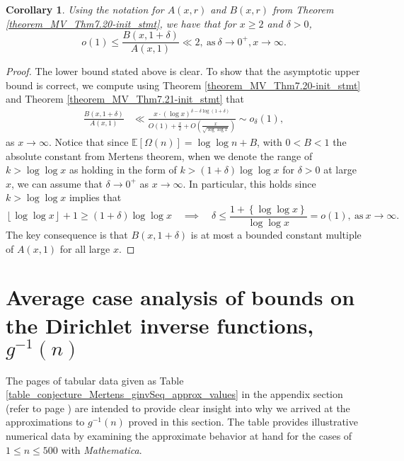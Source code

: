 \documentclass[11pt,reqno,a4letter]{article}
\numberwithin{figure}{section}
\numberwithin{table}{section}
\newcommand{\floor}[1]{\left\lfloor #1 \right\rfloor}
\theoremstyle{plain}
\newtheorem{cor}[theorem]{Corollary}
\numberwithin{theorem}{section}
\theoremstyle{definition}
\begin{document}
\begin{cor} 
\label{theorem_MV_Thm7.20} 
Using the notation for $A(x, r)$ and $B(x, r)$ from 
Theorem \ref{theorem_MV_Thm7.20-init_stmt}, 
we have that for $x \geq 2$ and $\delta > 0$, 
\[
o(1) \leq \frac{B(x, 1+\delta)}{A(x, 1)} \ll 2, 
     \mathrm{\ as\ } \delta \rightarrow 0^{+}, x \rightarrow \infty. 
\]
\end{cor} 
\begin{proof} 
The lower bound stated above is clear. To show that the asymptotic 
upper bound is correct, we compute using Theorem \ref{theorem_MV_Thm7.20-init_stmt} and 
Theorem \ref{theorem_MV_Thm7.21-init_stmt} that 
\begin{align*} 
\frac{B(x, 1+\delta)}{A(x, 1)} & \ll 
     \frac{x \cdot (\log x)^{\delta - \delta\log(1+\delta)}}{ 
     O(1) + \frac{x}{2} + 
     O\left(\frac{x}{\sqrt{\log\log x}}\right)} 
     \sim 
     o_{\delta}(1),  
\end{align*} 
as $x \rightarrow \infty$. Notice that since $\mathbb{E}[\Omega(n)] = \log\log n + B$, with $0 < B < 1$ the 
absolute constant from Mertens theorem, 
when we denote the range of $k > \log\log x$ as holding in the form of 
$k > (1 + \delta) \log\log x$ for $\delta > 0$ at large $x$, we can assume that 
$\delta \rightarrow 0^{+}$ as $x \rightarrow \infty$. 
In particular, this holds since $k > \log\log x$ implies that 
\[
\floor{\log\log x} + 1 \geq (1 + \delta) \log\log x \quad\implies\quad 
     \delta \leq \frac{1 + \left\{\log\log x\right\}}{\log\log x} = o(1), 
     \mathrm{\ as\ } x \rightarrow \infty. 
\] 
The key consequence is that $B(x, 1 + \delta)$ is at most a bounded constant multiple of 
$A(x, 1)$ for all large $x$. 
\end{proof} 

\newpage
\section{Average case analysis of bounds on the Dirichlet inverse functions, $g^{-1}(n)$} 
\label{Section_InvFunc_PreciseExpsAndAsymptotics} 

The pages of tabular data given as Table \ref{table_conjecture_Mertens_ginvSeq_approx_values} 
in the appendix section (refer to 
page \pageref{table_conjecture_Mertens_ginvSeq_approx_values}) are intended to 
provide clear insight into why we arrived at the approximations to 
$g^{-1}(n)$ proved in this section. The table provides illustrative 
numerical data by examining the approximate behavior 
at hand for the cases of $1 \leq n \leq 500$ with \emph{Mathematica}. 
\end{document}
